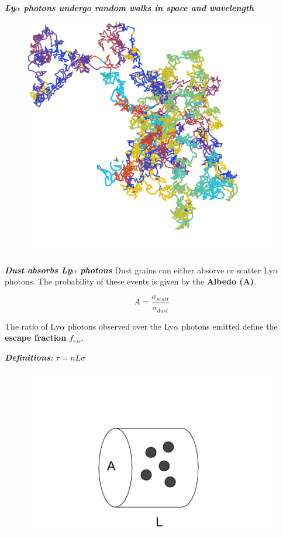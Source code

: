 \documentclass{beamer}
\begin{document}
\begin{frame}{\textit{\textbf{Ly$\alpha$ photons undergo random walks in space and wavelength}}}
\begin{figure}
\includegraphics[scale=0.4]{Figures/rand_walk.png}
\end{figure}
\end{frame}

\begin{frame}{\textit{\textbf{Dust absorbs Ly$\alpha$ photons}}}
Dust grains can either absorve or scatter Ly$\alpha$ photons. The probability
of these events is given by the \textbf{Albedo (A)}.

\[   
A = \dfrac{\sigma_{scatt}}{\sigma_{dust}}
\]

The ratio of Ly$\alpha$ photons observed over the Ly$\alpha$ photons emitted
define the \textbf{escape fraction $f_{esc}$}.
 
\end{frame}

\begin{frame}{\textit{\textbf{Definitions:}}}
\LARGE{$\tau = nL\sigma$}
\begin{figure}
\includegraphics[scale=0.3]{Figures/od.png}
\end{figure} 
\end{frame}
\end{document}
